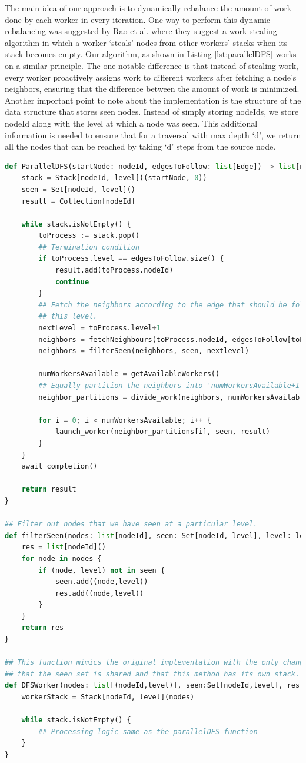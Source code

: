\medskip
The main idea of our approach is to dynamically rebalance the amount of work
done by each worker in every iteration. One way to perform this dynamic
rebalancing was suggested by Rao et al.\cite{rao1987parallel} where they suggest
a work-stealing algorithm in which a worker `steals' nodes from other workers'
stacks when its stack becomes empty. Our algorithm, as shown in 
Listing-\ref{lst:parallelDFS} works on a similar principle. The one notable
difference is that instead of stealing work, every worker proactively assigns
work to different workers after fetching a node's neighbors, ensuring that
the difference between the amount of work is minimized. Another important point
to note about the implementation is the structure of the data structure that
stores seen nodes. Instead of simply storing nodeIds, we store nodeId along with
the level at which a node was seen. This additional information is needed to ensure 
that for a traversal
with max depth `d', we return all the nodes that can be reached by taking `d'
steps from the source node.
\begin{lstlisting}[caption={Parallel DFS}, label={lst:parallelDFS}, captionpos=b, language=Python]
def ParallelDFS(startNode: nodeId, edgesToFollow: list[Edge]) -> list[nodeId] {
    stack = Stack[nodeId, level]((startNode, 0))
    seen = Set[nodeId, level]()
    result = Collection[nodeId]

    while stack.isNotEmpty() {
        toProcess := stack.pop()
        ## Termination condition
        if toProcess.level == edgesToFollow.size() {
            result.add(toProcess.nodeId)
            continue
        }
        ## Fetch the neighbors according to the edge that should be followed at
        ## this level.
        nextLevel = toProcess.level+1
        neighbors = fetchNeighbours(toProcess.nodeId, edgesToFollow[toProcess.level])
        neighbors = filterSeen(neighbors, seen, nextlevel)

        numWorkersAvailable = getAvailableWorkers()
        ## Equally partition the neighbors into 'numWorkersAvailable+1' lists
        neighbor_partitions = divide_work(neighbors, numWorkersAvailable)

        for i = 0; i < numWorkersAvailable; i++ {
            launch_worker(neighbor_partitions[i], seen, result)
        }
    }
    await_completion()

    return result
}

## Filter out nodes that we have seen at a particular level.
def filterSeen(nodes: list[nodeId], seen: Set[nodeId, level], level: level) -> list[nodeId] {
    res = list[nodeId]()
    for node in nodes {
        if (node, level) not in seen {
            seen.add((node,level))
            res.add((node,level))
        }
    }
    return res
}

## This function mimics the original implementation with the only change being
## that the seen set is shared and that this method has its own stack.
def DFSWorker(nodes: list[(nodeId,level)], seen:Set[nodeId,level], res: list[nodeId]) {
    workerStack = Stack[nodeId, level](nodes)

    while stack.isNotEmpty() {
        ## Processing logic same as the parallelDFS function
    }
}
\end{lstlisting}

